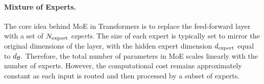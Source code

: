\paragraph{Mixture of Experts.} 
The core idea behind MoE in Transformers is to replace the feed-forward layer with a set of $N_\text{expert}$ \textit{experts}. The size of each expert is typically \citep{fedus2022switch, zhou2022mixtureofexperts, zhou2023brainformers, jiang2024mixtral} set to mirror the original dimensions of the layer, with the hidden expert dimension $d_\text{expert}{}$ equal to $d_\text{ff}.$ Therefore, the total number of parameters in MoE scales linearly with the number of experts. 
However, the computational cost remains approximately constant as each input is routed and then processed by a subset of experts.

